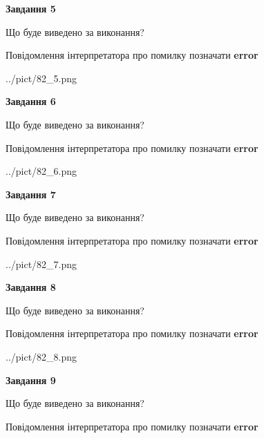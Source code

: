 \documentclass[11pt, ukrainian]{article}
\begin{document}
{\begin {large}
{\begin {center}\textbf{Завдання 5}\end {center}}\par
Що буде виведено за виконання? \par
Повідомлення інтерпретатора про помилку позначати \textbf{error}

\begin{center}
	{../pict/82_5.png}
\end{center}
\newpage

{\begin {center}\textbf{Завдання 6}\end {center}}\par
Що буде виведено за виконання? \par
Повідомлення інтерпретатора про помилку позначати \textbf{error}

\begin{center}
	{../pict/82_6.png}
\end{center}
\newpage

{\begin {center}\textbf{Завдання 7}\end {center}}\par
Що буде виведено за виконання? \par
Повідомлення інтерпретатора про помилку позначати \textbf{error}

\begin{center}
	{../pict/82_7.png}
\end{center}
\newpage

{\begin {center}\textbf{Завдання 8}\end {center}}\par
Що буде виведено за виконання? \par
Повідомлення інтерпретатора про помилку позначати \textbf{error}

\begin{center}
	{../pict/82_8.png}
\end{center}
\newpage

{\begin {center}\textbf{Завдання 9}\end {center}}\par
Що буде виведено за виконання? \par
Повідомлення інтерпретатора про помилку позначати \textbf{error}


\end{large}}
\end{document}
